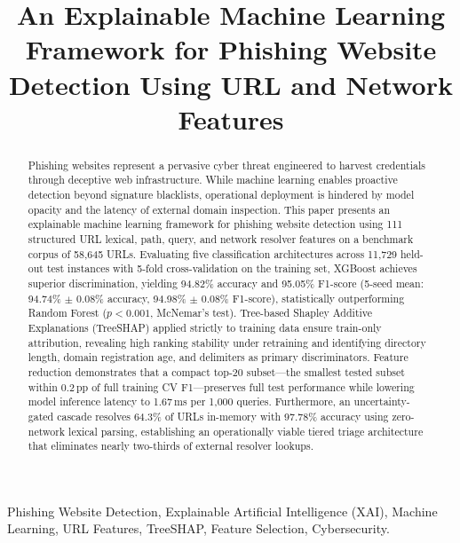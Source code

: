 \documentclass[a4paper,conference]{IEEEtran}
\begin{document}
\title{An Explainable Machine Learning Framework for Phishing Website Detection Using URL and Network Features}

\author{
}

\maketitle

\begin{abstract}
Phishing websites represent a pervasive cyber threat engineered to harvest credentials through deceptive web infrastructure. While machine learning enables proactive detection beyond signature blacklists, operational deployment is hindered by model opacity and the latency of external domain inspection. This paper presents an explainable machine learning framework for phishing website detection using 111 structured URL lexical, path, query, and network resolver features on a benchmark corpus of 58,645 URLs. Evaluating five classification architectures across 11,729 held-out test instances with 5-fold cross-validation on the training set, XGBoost achieves superior discrimination, yielding 94.82\% accuracy and 95.05\% F1-score (5-seed mean: 94.74\% $\pm$ 0.08\% accuracy, 94.98\% $\pm$ 0.08\% F1-score), statistically outperforming Random Forest ($p < 0.001$, McNemar's test). Tree-based Shapley Additive Explanations (TreeSHAP) applied strictly to training data ensure train-only attribution, revealing high ranking stability under retraining and identifying directory length, domain registration age, and delimiters as primary discriminators. Feature reduction demonstrates that a compact top-20 subset—the smallest tested subset within 0.2\,pp of full training CV F1—preserves full test performance while lowering model inference latency to 1.67\,ms per 1,000 queries. Furthermore, an uncertainty-gated cascade resolves 64.3\% of URLs in-memory with 97.78\% accuracy using zero-network lexical parsing, establishing an operationally viable tiered triage architecture that eliminates nearly two-thirds of external resolver lookups.
\end{abstract}

\begin{IEEEkeywords}
Phishing Website Detection, Explainable Artificial Intelligence (XAI), Machine Learning, URL Features, TreeSHAP, Feature Selection, Cybersecurity.
\end{IEEEkeywords}
\end{document}
